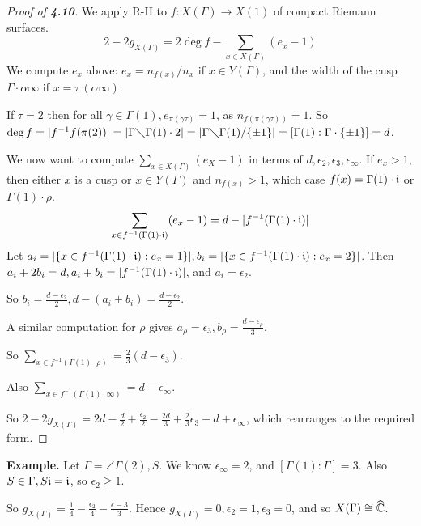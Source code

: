 \documentclass[10pt,a4paper]{article}
\begin{document}
\begin{proof}[Proof of \textbf{4.10}]
  We apply R-H to $f:X(\Gamma)\to X(1)$ of compact Riemann surfaces.
  \[2-2 g_{X(\Gamma)} = 2\deg f - \sum_{x \in X(\Gamma)}(e_x-1)\]
  We compute $e_x$ above: $e_x = n_{f(x)}/n_x$ if $x \in Y(\Gamma)$, and the width of the cusp $\Gamma \cdot \alpha \infty$ if $x = \pi(\alpha \infty)$.

  If $\tau = 2$ then for all $\gamma \in \Gamma(1), e_{\pi(\gamma \tau)} = 1$, as $n_{f(\pi(\gamma\tau))} = 1$. So $\deg f = |f^{-1}f(\pi(2))| = |\Gamma \diagdown \Gamma(1)\cdot 2| = |\Gamma \diagdown \Gamma(1) / \{\pm 1\}| = [\Gamma(1):\Gamma\cdot \{\pm 1\}] = d$.

  We now want to compute $\sum_{x \in X(\Gamma)}(e_X - 1)$ in terms of $d, \epsilon_2, \epsilon_3, \epsilon_\infty$. If $e_x > 1$, then either $x$ is a cusp or $x \in Y(\Gamma)$ and $n_{f(x)} > 1$, which case $f(x) = \Gamma(1)\cdot \mathfrak{i}$ or $\Gamma(1) \cdot \rho$.
  \[\sum_{x \in f^{-1}(\Gamma(1)\cdot \mathfrak{i})}(e_x - 1)=d-|f^{-1}(\Gamma(1)\cdot \mathfrak{i})|\]
  Let $a_i = |\{x \in f^{-1}(\Gamma(1)\cdot \mathfrak{i}) : e_x = 1\}|, b_i = |\{x \in f^{-1}(\Gamma(1)\cdot \mathfrak{i}): e_x = 2\}|$. Then $a_i + 2b_i = d, a_i + b_i = |f^{-1}(\Gamma(1)\cdot \mathfrak{i})|$, and $a_i = \epsilon_2$.

  So $b_i = \frac{d-\epsilon_2}{2}, d - (a_i+b_i) = \frac{d-\epsilon_2}{2}$.

  A similar computation for $\rho$ gives $a_\rho = \epsilon_3, b_\rho = \frac{d-\epsilon_\rho}{3}$.

  So $\sum_{x \in f^{-1}(\Gamma(1)\cdot \rho)} = \frac{2}{3}(d-\epsilon_3)$.

  Also $\sum_{x \in f^{-1}(\Gamma(1)\cdot \infty)} = d- \epsilon_\infty$.

  So $2-2g_{X(\Gamma)} = 2d - \frac{d}{2} + \frac{\epsilon_2}{2} - \frac{2d}{3} + \frac{2}{3}\epsilon_3 - d + \epsilon_\infty$, which rearranges to the required form.
\end{proof}
\textbf{Example.} Let $\Gamma = \angle{\Gamma(2), S}$. We know $\epsilon_\infty = 2$, and $[\Gamma(1):\Gamma] = 3$. Also $S \in \Gamma, S\mathfrak{i} = \mathfrak{i}$, so $\epsilon_2 \geq 1$.

So $g_{X(\Gamma)} = \frac{1}{4} - \frac{\epsilon_2}{4} - \frac{\epsilon-3}{3}$. Hence $g_{X(\Gamma)} = 0, \epsilon_2 = 1, \epsilon_3 = 0$, and so $X(\Gamma) \cong \widehat{\mathbb{C}}$.
\end{document}
